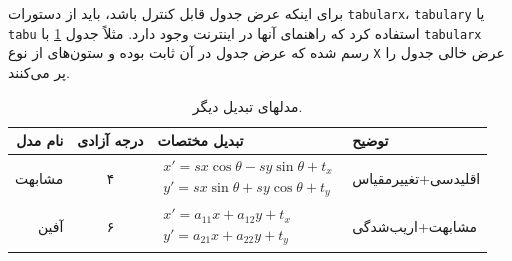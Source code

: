 برای اینکه عرض جدول قابل کنترل باشد، باید از دستورات
\verb|tabularx|،
\verb|tabulary| یا
\verb|tabu|
استفاده کرد که راهنمای آنها در اینترنت وجود دارد.
مثلاً جدول
\ref{tab:motionModelsCont}
با
\verb|tabularx|
رسم شده که عرض جدول در آن ثابت بوده و ستون‌های از نوع
\verb|X|
عرض خالی جدول را پر می‌کنند.
\begin{table}[ht]
	\caption{مدلهای تبدیل دیگر.}
	\label{tab:motionModelsCont}
	\centering
	\onehalfspacing
	\begin{tabularx}{\textwidth}{|r|c|l|X|}
		\hline نام مدل & درجه آزادی & تبدیل مختصات & توضیح \\ 
		\hline مشابهت & ۴ & $\begin{aligned} x'=sx\cos\theta - sy\sin\theta+t_x \\ y'=sx\sin\theta+sy\cos\theta+t_y  \end{aligned}$  & اقلیدسی+تغییرمقیاس \\ 		
		\hline آفین & ۶ & $\begin{aligned} x'=a_{11}x+a_{12}y+t_x \\ y'=a_{21}x+a_{22}y+t_y \end{aligned}$  & مشابهت+اریب‌شدگی \\
		\hline
	\end{tabularx}
\end{table}

